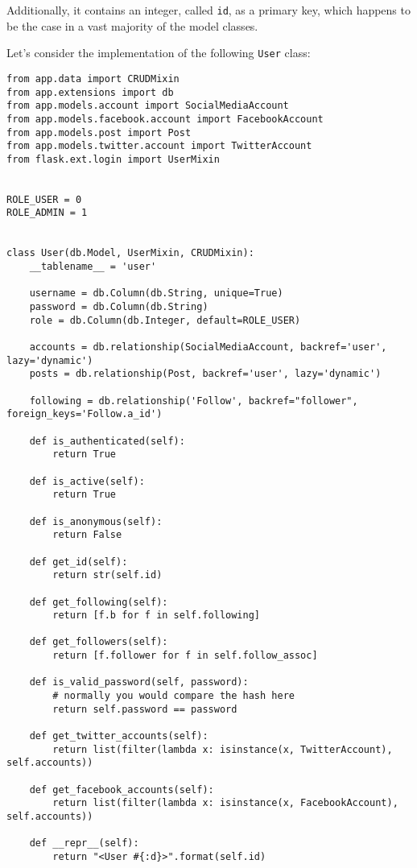 \documentclass[../main/main.tex]{subfiles}
\begin{document}
Additionally, it contains an integer, called \lstinline|id|, as a
primary key, which happens to be the case in a vast majority of the
model classes.

Let's consider the implementation of the following \lstinline|User|
class: 

\begin{lstlisting}[caption=app/models/user.py, label=lst:user.py]
from app.data import CRUDMixin
from app.extensions import db
from app.models.account import SocialMediaAccount
from app.models.facebook.account import FacebookAccount
from app.models.post import Post
from app.models.twitter.account import TwitterAccount
from flask.ext.login import UserMixin


ROLE_USER = 0
ROLE_ADMIN = 1


class User(db.Model, UserMixin, CRUDMixin):
    __tablename__ = 'user'

    username = db.Column(db.String, unique=True)
    password = db.Column(db.String)
    role = db.Column(db.Integer, default=ROLE_USER)

    accounts = db.relationship(SocialMediaAccount, backref='user', lazy='dynamic')
    posts = db.relationship(Post, backref='user', lazy='dynamic')

    following = db.relationship('Follow', backref="follower", foreign_keys='Follow.a_id')

    def is_authenticated(self):
        return True

    def is_active(self):
        return True

    def is_anonymous(self):
        return False

    def get_id(self):
        return str(self.id)

    def get_following(self):
        return [f.b for f in self.following]

    def get_followers(self):
        return [f.follower for f in self.follow_assoc]

    def is_valid_password(self, password):
        # normally you would compare the hash here
        return self.password == password

    def get_twitter_accounts(self):
        return list(filter(lambda x: isinstance(x, TwitterAccount), self.accounts))

    def get_facebook_accounts(self):
        return list(filter(lambda x: isinstance(x, FacebookAccount), self.accounts))

    def __repr__(self):
        return "<User #{:d}>".format(self.id)
\end{lstlisting}
\end{document}
